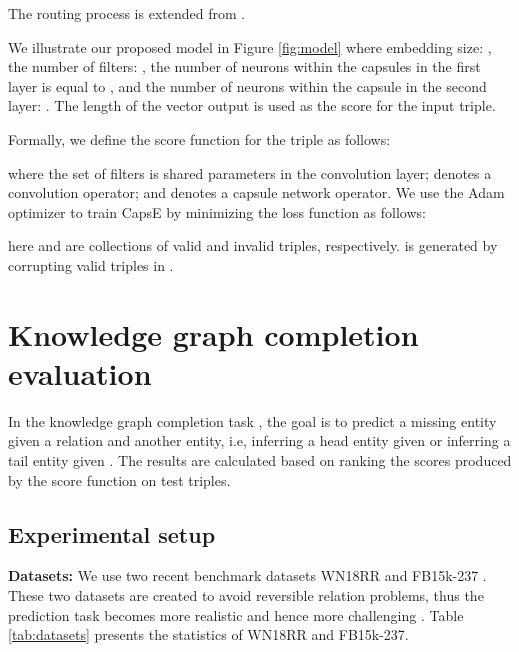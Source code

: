 \documentclass[11pt,a4paper]{article}
\begin{document}
\begin{algorithm}[ht]
\DontPrintSemicolon
\SetAlgoVlined
{}

\caption{The routing process is extended from \citet{sabour2017dynamic}.}
\label{alg:routing}
\end{algorithm}


We illustrate our proposed model in Figure \ref{fig:model} where embedding size: , the number of filters: , the number of neurons within the capsules in the first layer is equal to , and the number of neurons within the capsule in the second layer: . The length of the vector output  is used as the score for the input triple. 

Formally, we define the score function  for the triple  as follows:

where the set of filters  is shared parameters in the convolution layer;  denotes a convolution operator; and  denotes a capsule network operator.
We use the Adam optimizer \citep{kingma2014adam} to train CapsE by minimizing the loss function \citep{Trouillon2016,Nguyen2018} as follows:

  \vspace{-10pt}

here   and   are collections of valid and invalid triples, respectively.   is generated by corrupting valid triples in . 




\section{Knowledge graph completion evaluation }\label{ssec:kbc}
In the knowledge graph completion task \citep{NIPS2013_5071}, the goal is to predict a missing entity given a relation and another entity, i.e, inferring a head entity  given  or inferring a tail entity  given . 
The results are calculated based on ranking the scores produced by the score function  on test triples.

\subsection{Experimental setup} 
\noindent\textbf{Datasets:} 
We use two recent benchmark datasets WN18RR \citep{Dettmers2017} and FB15k-237 \citep{toutanova-chen:2015:CVSC}. These two datasets are created to avoid  reversible relation problems, thus the prediction task becomes more realistic and hence more challenging \citep{toutanova-chen:2015:CVSC}.
Table \ref{tab:datasets} presents the statistics of WN18RR and FB15k-237.
\end{document}
